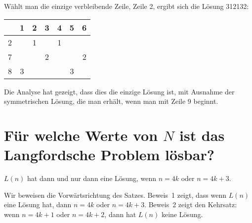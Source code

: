 Wählt man die einzige verbleibende Zeile, Zeile 2, ergibt sich die Lösung 3{}1{}2{}1{}3{}2:
\begin{center}
\addtolength{\tabcolsep}{4pt}
\begin{tabular}{|c||c|c|c|c|c|c|}
\hline
&1&2&3&4&5&6\\\hline\hline
2&&1&&1&&\\\hline
7&&&2&&&2\\\hline
8&3&&&&3&\\\hline
\end{tabular}
\end{center}
Die Analyse hat gezeigt, dass dies die einzige Lösung ist, mit Ausnahme der symmetrischen Lösung, die man erhält, wenn man mit Zeile 9 beginnt.

\section{Für welche Werte von $N$ ist das Langfordsche Problem lösbar?}\label{s.langford-theorem}

\begin{theorem} \label{thm.langford}
$L(n)$ hat dann und nur dann eine Lösung, wenn $n=4k$ oder $n=4k+3$.
\end{theorem}

Wir beweisen die Vorwärtsrichtung des Satzes. Beweis~1 zeigt, dass wenn $L(n)$ eine Lösung hat, dann $n=4k$ oder $n=4k+3$. Beweis~2 zeigt den Kehrsatz: wenn $n=4k+1$ oder $n=4k+2$, dann hat $L(n)$ keine Lösung.

